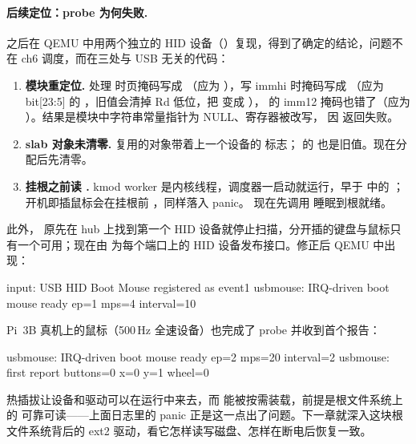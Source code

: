 \paragraph{后续定位：probe 为何失败.} 之后在 QEMU 中用两个独立的 HID 设备（）复现，得到了确定的结论，问题不在 ch6 调度，而在三处与 USB 无关的代码：

\begin{enumerate}
  \item \textbf{模块重定位.}  处理  时页掩码写成 （应为 ），写 immhi 时掩码写成 （应为 bit[23:5] 的 ，旧值会清掉 Rd 低位，把  变成 ）， 的 imm12 掩码也错了（应为 ）。结果是模块中字符串常量指针为 NULL、寄存器被改写， 因  返回失败。
  \item \textbf{slab 对象未清零.}  复用的对象带着上一个设备的  标志； 的  也是旧值。现在分配后先清零。
  \item \textbf{挂根之前读 .} kmod worker 是内核线程，调度器一启动就运行，早于  中的 ；开机即插鼠标会在挂根前 ，同样落入  panic。 现在先调用  睡眠到根就绪。
\end{enumerate}

此外， 原先在 hub 上找到第一个 HID 设备就停止扫描，分开插的键盘与鼠标只有一个可用；现在由  为每个端口上的 HID 设备发布接口。修正后 QEMU 中出现：

\begin{txtcode}
input: USB HID Boot Mouse registered as event1
usbmouse: IRQ-driven boot mouse ready ep=1 mps=4 interval=10
\end{txtcode}

Pi~3B 真机上的鼠标（500\,Hz 全速设备）也完成了 probe 并收到首个报告：

\begin{txtcode}
usbmouse: IRQ-driven boot mouse ready ep=2 mps=20 interval=2
usbmouse: first report buttons=0 x=0 y=1 wheel=0
\end{txtcode}

热插拔让设备和驱动可以在运行中来去，而  能被按需装载，前提是根文件系统上的  可靠可读——上面日志里的  panic 正是这一点出了问题。下一章就深入这块根文件系统背后的 ext2 驱动，看它怎样读写磁盘、怎样在断电后恢复一致。
